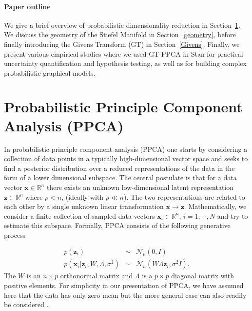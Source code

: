 \documentclass{article}
\newcommand{\mb}[1]{\mathbf{#1}}
\begin{document}
\paragraph{Paper outline} We give a brief overview of probabilistic dimensionality reduction in Section~\ref{Probabilistic dimensionality reduction}. We discuss the geometry of the Stiefel Manifold in Section~\ref{geometry}, before finally introducing the Givens Transform (GT) in Section~\ref{Givens}. Finally, we present various empirical studies where we used GT-PPCA in Stan for practical uncertainty quantification and hypothesis testing, as well as for building complex probabilistic graphical models.


\section{Probabilistic Principle Component Analysis (PPCA)} \label{Probabilistic dimensionality reduction}

In probabilistic principle component analysis (PPCA) one starts by considering a collection of data points in a typically high-dimensional vector space and seeks to find a posterior distribution over a reduced representations of the data in the form of a lower dimensional subspace.  The central postulate is that for a data vector $\mathbf{x} \in \mathbb{R}^n$ there exists an unknown low-dimensional latent representation $\mathbf{z} \in \mathbb{R}^p$ where $p < n$, (ideally with $p \ll n$).  The two representations are related to each other by a single unknown linear transformation $\mathbf{x} \rightarrow \mathbf{z}$.  Mathematically, we consider a finite collection of sampled data vectors $\mathbf{x}_i \in \mathbb{R}^n$, $i = 1, \cdots, N$ and try to estimate this subspace.  Formally, PPCA consists of the following generative process

\begin{eqnarray}
\label{eq:PpcaGenerativeProcess}
p(\mb{z}_i) &\sim& \mathcal{N}_p(0, I) \nonumber\\
p(\mb{x}_i | \mb{z}_i, W, \Lambda, \sigma^2) &\sim& \mathcal{N}_n(W \Lambda \mb{z}_i, \sigma^2 I).
\end{eqnarray}
The $W$ is an $n \times p$ orthonormal matrix and $\Lambda$ is a $p \times p$ diagonal matrix with positive elements.  For simplicity in our presentation of PPCA, we have assumed here that the data has only zero mean but the more general case can also readily be considered \citep[chapt.~12.1]{murphy2012machine}. 
\end{document}
